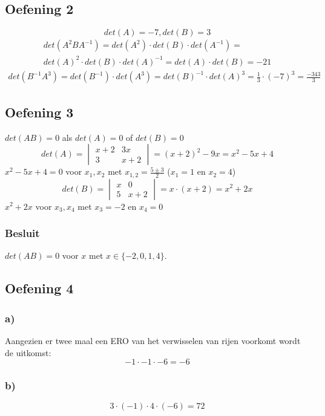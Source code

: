 \documentclass[lineaire_algebra_oplossingen.tex]{subfiles}
\begin{document}
\subsection{Oefening 2}
\[det(A) = -7, det(B) = 3\]
\begin{gather*}
    det(A^2BA^{-1}) =
    det(A^2) \cdot det(B) \cdot det(A^{-1}) =\\
    det(A)^2 \cdot det(B) \cdot det(A)^{-1} = det(A) \cdot det(B) = -21
\end{gather*}
\begin{gather*}
    det(B^{-1}A^3) = det(B^{-1}) \cdot det(A^3) = det(B)^{-1} \cdot det(A)^3 = \frac{1}{3} \cdot (-7)^3 = \frac{-343}{3}
\end{gather*}

\subsection{Oefening 3}
$det(AB) = 0$ als $det(A) = 0$ of $det(B) = 0$
\\
\[det(A) = \begin{vmatrix}
x + 2 & 3x\\
3 & x + 2
\end{vmatrix}
 = (x + 2)^2 - 9x = x^2 -5 x + 4
\]
$x^2 -5 x + 4 = 0$ voor $x_1, x_2$ met $x_{1,2} = \frac{5 \pm 3}{2}$ ($x_1 = 1$ en $x_2 = 4$)
\\
\[det(B) = \begin{vmatrix}
x & 0\\
5 & x + 2
\end{vmatrix}
 = x \cdot (x + 2) = x^2 + 2x\]
$x^2 + 2x$ voor $x_3, x_4$ met $x_3 = -2$ en $x_4 = 0$ 
\subsubsection*{Besluit}
$det(AB) = 0$ voor $x$ met $x \in \{-2, 0, 1, 4\}$.
\subsection{Oefening 4}
\subsubsection*{a)}
Aangezien er twee maal een ERO van het verwisselen van rijen voorkomt wordt de uitkomst:
$$-1\cdot -1\cdot -6 = -6$$
\subsubsection*{b)}
$$3\cdot(-1)\cdot 4 \cdot (-6) = 72$$
\end{document}
